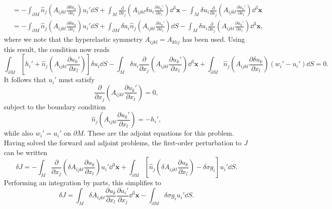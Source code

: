 \documentclass[a4paper,10pt]{paper}
\begin{document}
\begin{enumerate}
\begin{align*}
    &=-\int_{\partial M}\hat{n}_{j}\left(A_{ijkl}\frac{\partial\delta u_{k}}{\partial x_{l}}\right)u_{i}'\dd S+\int_{M}\frac{\partial}{\partial x_{j}}\left(A_{ijkl}\delta u_{i}\frac{\partial u_{k}'}{\partial x_{l}}\right)\dd^{3}\mathbf{x} -\int_{M}\delta u_{i}\frac{\partial}{\partial x_{j}}\left(A_{ijkl}\frac{\partial u_{k}'}{\partial x_{l}}\right)\dd^{3}\mathbf{x} \\
    &=-\int_{\partial M}\hat{n}_{j}\left(A_{ijkl}\frac{\partial\delta u_{k}}{\partial x_{l}}\right)u_{i}'\dd S+\int_{\partial M}\delta u_{i}\hat{n}_{j}\left(A_{ijkl}\frac{\partial u_{k}'}{\partial x_{l}}\right)\dd S -\int_{M}\delta u_{i}\frac{\partial}{\partial x_{j}}\left(A_{ijkl}\frac{\partial u_{k}'}{\partial x_{l}}\right)\dd^{3}\mathbf{x},
\end{align*}
where we note that the hyperelastic symmetry $A_{ijkl}=A_{klij}$ has been used. Using this result, the condition now reads
\begin{equation*}
    \int_{\partial M}[h_{i}'+\hat{n}_{j}\left(A_{ijkl}\frac{\partial u_{k}'}{\partial x_{l}}\right)]\delta u_{i}\dd S-\int_{M}\delta u_{i}\frac{\partial}{\partial x_{j}}\left(A_{ijkl}\frac{\partial u_{k}'}{\partial x_{l}}\right)\dd^{3}\mathbf{x} +\int_{\partial M}\hat{n}_{j}\left(A_{ijkl}\frac{\partial\delta u_{k}}{\partial x_{l}}\right)(w_{i}'-u_{i}')\dd S=0.
\end{equation*}
It follows that $u_{i}'$ must satisfy
\begin{equation*}
    \frac{\partial}{\partial x_{j}}\left(A_{ijkl}\frac{\partial u_{k}'}{\partial x_{l}}\right)=0,
\end{equation*}
subject to the boundary condition
\begin{equation*}
    \hat{n}_{j}\left(A_{ijkl}\frac{\partial u_{k}'}{\partial x_{l}}\right)=-h_{i}',
\end{equation*}
while also $w_{i}'=u_{i}'$ on $\partial M$. These are the adjoint equations for this problem. Having solved the forward and adjoint problems, the first-order perturbation to $J$ can be written
\begin{equation*}
    \delta J = -\int_{M}\frac{\partial}{\partial x_{j}}\left(\delta A_{ijkl}\frac{\partial u_{k}}{\partial x_{l}}\right)u_{i}'\dd^{3}\mathbf{x} + \int_{\partial M}\left[\hat{n}_{j}\left(\delta A_{ijkl}\frac{\partial u_{k}}{\partial x_{l}}\right)-\delta\sigma g_{i}\right]u_{i}'\dd S.
\end{equation*}
Performing an integration by parts, this simplifies to
\begin{equation*}
    \delta J=\int_{M}\delta A_{ijkl}\frac{\partial u_{k}}{\partial x_{l}}\frac{\partial u_{i}'}{\partial x_{j}}\dd^{3}\mathbf{x}-\int_{\partial M}\delta\sigma g_{i}u_{i}'\dd S.

\end{equation*}
\end{enumerate}
\end{document}
